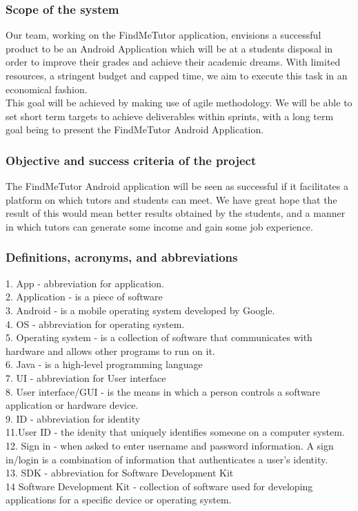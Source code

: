 \documentclass[12pt]{article}
\begin{document}
\subsubsection{Scope of the system}
\begin{flushleft}
Our team, working on the FindMeTutor application, envisions a successful product to be an Android Application which will be at a students disposal in order to improve their grades and achieve their academic dreams. With limited resources, a stringent budget and capped time, we aim to execute this task in an economical fashion.\\
This goal will be achieved by making use of agile methodology. We will be able to set short term targets to achieve deliverables within sprints, with a long term goal being to present the FindMeTutor Android Application. 
\end{flushleft}
\subsubsection{Objective and success criteria of the project}
\begin{flushleft}
The FindMeTutor Android application will be seen as successful if it facilitates a platform on which tutors and students can meet. We have great hope that the result of this would mean better results obtained by the students, and a manner in which tutors can generate some income and gain some job experience. 
\end{flushleft}
\subsubsection{Definitions, acronyms, and abbreviations}
1. App - abbreviation for application. \\
2. Application - is a piece of software \\
3. Android - is a mobile operating system developed by Google. \\
4. OS - abbreviation for operating system.\\
5. Operating system - is a collection of software that communicates with hardware and allows other programs to run on it.\\
6. Java - is a high-level programming language\\
7. UI - abbreviation for User interface\\
8. User interface/GUI - is the means in which a person controls a software application or hardware device.\\
9. ID - abbreviation for identity\\
11.User ID - the idenity that uniquely identifies someone on a computer system.\\
12. Sign in - when asked to enter username and password information. A sign in/login is a combination of information that authenticates a user's identity. \\
13. SDK - abbreviation for Software Development Kit\\
14 Software Development Kit -  collection of software used for developing applications for a specific device or operating system.
 
\end{document}
